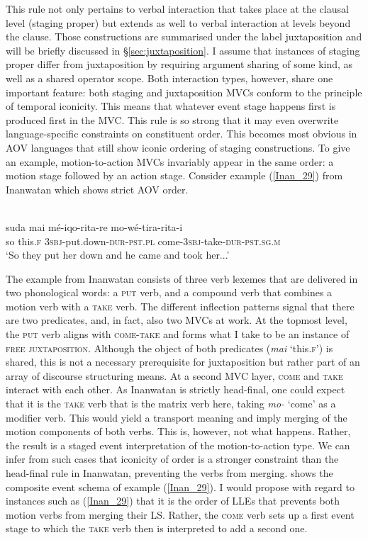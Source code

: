 This rule not only pertains to verbal interaction that takes place at the clausal level (staging proper) but extends as well to verbal interaction at levels beyond the clause. Those constructions are summarised under the label juxtaposition and will be briefly discussed in §\ref{sec:juxtaposition}. I assume that instances of staging proper differ from juxtaposition by requiring argument sharing of some kind, as well as a shared operator scope. Both interaction types, however, share one important feature: both staging and juxtaposition MVCs conform to the principle of temporal iconicity. This means that whatever event stage happens first is produced first in the MVC. This rule is so strong that it may even overwrite language-specific constraints on constituent order. This becomes most obvious in AOV languages that still show iconic ordering of staging constructions. To give an example, motion-to-action MVCs invariably appear in the same order: a motion stage followed by an action stage. Consider example (\ref{Inan_29}) from Inanwatan which shows strict AOV order.

\ea \label{Inan_29}
\\
\gll suda mai mé-iqo-rita-re mo-wé-tira-rita-i \\
so this.\textsc{f} 3\textsc{sbj}-put.down-\textsc{dur}-\textsc{pst}.\textsc{pl} come-3\textsc{sbj}-take-\textsc{dur}-\textsc{pst}.\textsc{sg}.\textsc{m} \\
\glft `So they put her down and he came and took her...' \\ 
\z

The example from Inanwatan consists of three verb lexemes that are delivered in two phonological words: a \textsc{put} verb, and a compound verb that combines a motion verb with a \textsc{take} verb. The different inflection patterns signal that there are two predicates, and, in fact, also two MVCs at work. At the topmost level, the \textsc{put} verb aligns with \textsc{come-take} and forms what I take to be an instance of \textsc{free juxtaposition}. Although the object of both predicates (\textit{mai} `this.\textsc{f}') is shared, this is not a necessary prerequisite for juxtaposition but rather part of an array of discourse structuring means. At a second MVC layer, \textsc{come} and \textsc{take} interact with each other. As Inanwatan is strictly head-final, one could expect that it is the \textsc{take} verb that is the matrix verb here, taking \textit{mo-} `come' as a modifier verb. This would yield a transport meaning and imply merging of the motion components of both verbs. This is, however, not what happens. Rather, the result is a staged event interpretation of the motion-to-action type. We can infer from such cases that iconicity of order is a stronger constraint than the head-final rule in Inanwatan, preventing the verbs from merging.  shows the composite event schema of example (\ref{Inan_29}). I would propose with regard to instances such as (\ref{Inan_29}) that it is the order of LLEs that prevents both motion verbs from merging their LS. Rather, the \textsc{come} verb sets up a first event stage to which the \textsc{take} verb then is interpreted to add a second one.

